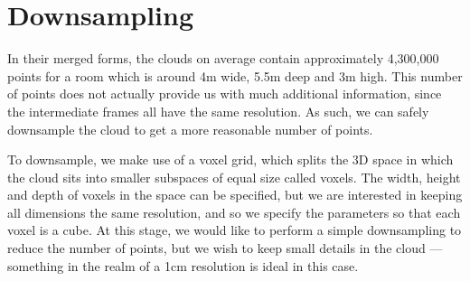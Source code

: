 \documentclass[11pt,a4paper]{kth-mag}
\begin{document}

\section{Downsampling}
In their merged forms, the clouds on average contain approximately 4,300,000
points for a room which is around 4m wide, 5.5m deep and 3m high. This number of
points does not actually provide us with much additional information, since the
intermediate frames all have the same resolution. As such, we can safely
downsample the cloud to get a more reasonable number of points.

To downsample, we make use of a voxel grid, which splits the 3D space in which
the cloud sits into smaller subspaces of equal size called voxels. The width,
height and depth of voxels in the space can be specified, but we are interested
in keeping all dimensions the same resolution, and so we specify the parameters
so that each voxel is a cube. At this stage, we would like to perform a simple
downsampling to reduce the number of points, but we wish to keep small details
in the cloud --- something in the realm of a 1cm resolution is ideal in this
case.
\end{document}
